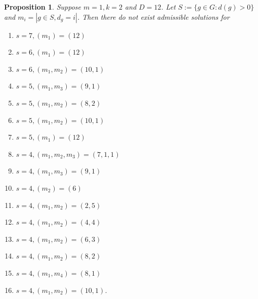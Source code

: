 \documentclass[12pt,twoside,]{amsart}
\theoremstyle{plain}
\newtheorem{proposition}[theorem]{Proposition}
\theoremstyle{definition}
\begin{document}
\begin{proposition}\label{m = 1; k = 2; D = 12 impossibility}
Suppose $m = 1, k = 2$ and $D = 12$. Let $S:=\{g\in G : d(g)>0\}$ and $m_i = | g \in S, d_g = i|$.  Then there do not exist admissible solutions for 
\begin{enumerate}
    \item $s = 7, (m_1) = (12)$
    \item $s = 6, (m_1) = (12)$
    \item $s = 6, (m_1, m_2) = (10,1)$
    \item $s = 5, (m_1,m_3) = (9,1)$
    \item $s = 5, (m_1,m_2) = (8,2)$
    \item $s = 5, (m_1,m_2) = (10,1)$
    \item $s = 5, (m_1) = (12)$
    \item $s = 4, (m_1,m_2,m_3)=(7,1,1)$
    \item $s = 4, (m_1,m_3)=(9,1)$
    \item $s = 4, (m_2)=(6)$
    \item $s = 4, (m_1,m_2)=(2,5)$
    \item $s = 4, (m_1,m_2)=(4,4)$
    \item $s = 4, (m_1,m_2)=(6,3)$
    \item $s = 4, (m_1,m_2)=(8,2)$
    \item $s = 4, (m_1,m_4)=(8,1)$
    \item $s = 4, (m_1,m_2)=(10,1)$.
    
\end{enumerate}
\end{proposition}
\end{document}
